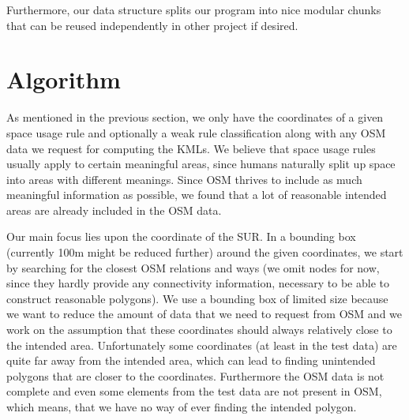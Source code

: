 \documentclass[11pt,fleqn]{book} %
\newcommand{\todol}{\todo[inline]} %
\begin{document}
Furthermore, our data structure splits our program into nice modular chunks that can be reused independently in other project if desired.

\section{Algorithm}\label{sec:algorithm}
\todol{pseudocode}
\todol{rework this section}

As mentioned in the previous section, we only have the coordinates of a given space usage rule and optionally a weak rule classification along with any OSM data we request for computing the KMLs. We believe that space usage rules usually apply to certain meaningful areas, since humans naturally split up space into areas with different meanings. Since OSM thrives to include as much meaningful information as possible, we found that a lot of reasonable intended areas are already included in the OSM data. 

Our main focus lies upon the coordinate of the SUR. In a bounding box (currently 100m might be reduced further) around the given coordinates, we start by searching for the closest OSM relations and ways (we omit nodes for now, since they hardly provide any connectivity information, necessary to be able to construct reasonable polygons). We use a bounding box of limited size because we want to reduce the amount of data that we need to request from OSM and we work on the assumption that these coordinates should always relatively close to the intended area. Unfortunately some coordinates (at least in the test data) are quite far away from the intended area, which can lead to finding unintended polygons that are closer to the coordinates. Furthermore the OSM data is not complete and even some elements from the test data are not present in OSM, which means, that we have no way of ever finding the intended polygon.
\end{document}
